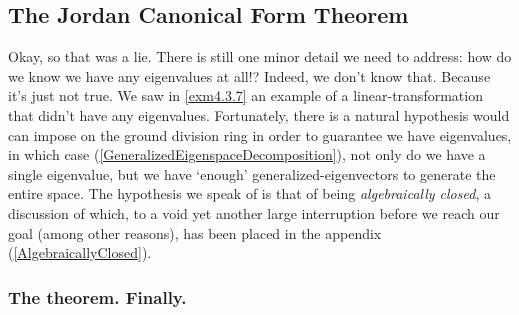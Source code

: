\subsection{The Jordan Canonical Form Theorem}

Okay, so that was a lie.  There is still one minor detail we need to address:  how do we know we have any eigenvalues at all!?  Indeed, we don't know that.  Because it's just not true.  We saw in \cref{exm4.3.7} an example of a linear-transformation that didn't have any eigenvalues.  Fortunately, there is a natural hypothesis would can impose on the ground division ring in order to guarantee we have eigenvalues, in which case (\cref{GeneralizedEigenspaceDecomposition}), not only do we have a single eigenvalue, but we have `enough' generalized-eigenvectors to generate the entire space.  The hypothesis we speak of is that of being \emph{algebraically closed}, a discussion of which, to a void yet another large interruption before we reach our goal (among other reasons), has been placed in the appendix (\cref{AlgebraicallyClosed}).

\subsubsection{The theorem.  Finally.}

